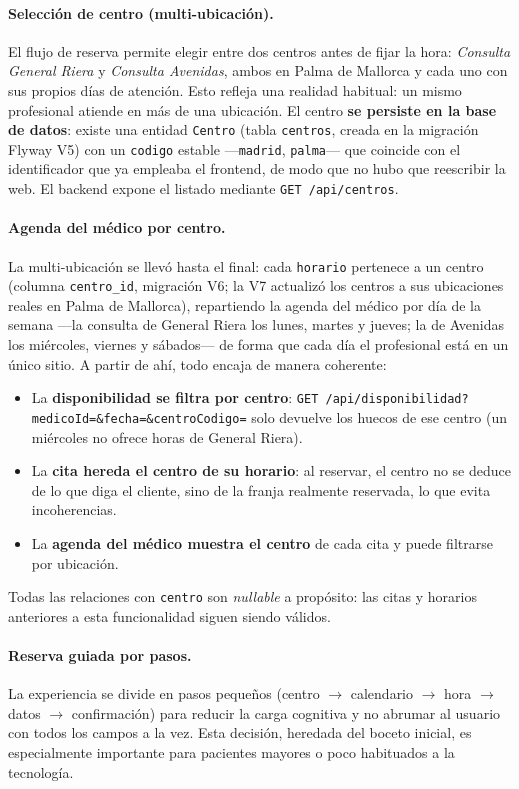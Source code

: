 \documentclass[12pt,a4paper]{report}
\begin{document}
\paragraph{Selección de centro (multi-ubicación).} El flujo de reserva permite elegir entre dos centros antes de fijar la hora: \emph{Consulta General Riera} y \emph{Consulta Avenidas}, ambos en Palma de Mallorca y cada uno con sus propios días de atención. Esto refleja una realidad habitual: un mismo profesional atiende en más de una ubicación. El centro \textbf{se persiste en la base de datos}: existe una entidad \texttt{Centro} (tabla \texttt{centros}, creada en la migración Flyway V5) con un \texttt{codigo} estable —\texttt{madrid}, \texttt{palma}— que coincide con el identificador que ya empleaba el frontend, de modo que no hubo que reescribir la web. El backend expone el listado mediante \texttt{GET /api/centros}.

\paragraph{Agenda del médico por centro.} La multi-ubicación se llevó hasta el final: cada \texttt{horario} pertenece a un centro (columna \texttt{centro\_id}, migración V6; la V7 actualizó los centros a sus ubicaciones reales en Palma de Mallorca), repartiendo la agenda del médico por día de la semana —la consulta de General Riera los lunes, martes y jueves; la de Avenidas los miércoles, viernes y sábados— de forma que cada día el profesional está en un único sitio. A partir de ahí, todo encaja de manera coherente:
\begin{itemize}
  \item La \textbf{disponibilidad se filtra por centro}: \texttt{GET /api/disponibilidad?medicoId=\&fecha=\&centroCodigo=} solo devuelve los huecos de ese centro (un miércoles no ofrece horas de General Riera).
  \item La \textbf{cita hereda el centro de su horario}: al reservar, el centro no se deduce de lo que diga el cliente, sino de la franja realmente reservada, lo que evita incoherencias.
  \item La \textbf{agenda del médico muestra el centro} de cada cita y puede filtrarse por ubicación.
\end{itemize}
Todas las relaciones con \texttt{centro} son \emph{nullable} a propósito: las citas y horarios anteriores a esta funcionalidad siguen siendo válidos.

\paragraph{Reserva guiada por pasos.} La experiencia se divide en pasos pequeños (centro $\rightarrow$ calendario $\rightarrow$ hora $\rightarrow$ datos $\rightarrow$ confirmación) para reducir la carga cognitiva y no abrumar al usuario con todos los campos a la vez. Esta decisión, heredada del boceto inicial, es especialmente importante para pacientes mayores o poco habituados a la tecnología.
\end{document}
